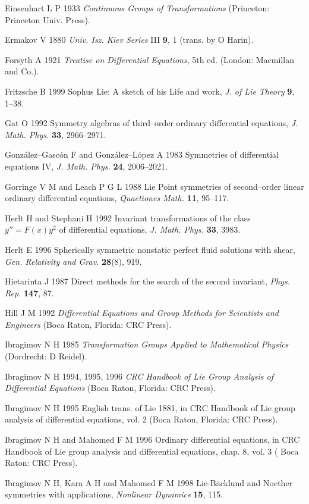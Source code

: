 Einsenhart L P 1933 {\em Continuous Groups of
Transformations} (Princeton: Princeton Univ. Press).

Ermakov V 1880 {\em Univ. Isz. Kiev Series} III {\bf 9}, 1
(trans. by O Harin).

Forsyth A 1921 {\em Treatise on Differential Equations}, 5th ed.
(London: Macmillan and Co.).

Fritzsche B 1999 Sophus Lie: A sketch of his Life and work,
{\em  J. of Lie Theory} {\bf 9}, 1--38.  

Gat O 1992  Symmetry algebras of third--order ordinary
differential equations, {\em J. Math. Phys.} {\bf 33}, 2966--2971.

Gonz\'alez--Gasc\'on F and Gonz\'alez--L\'opez  A 1983
Symmetries of differential equations IV, {\em J. Math. Phys.} {\bf 24},
2006--2021.

Gorringe V M and Leach P G L 1988
Lie Point symmetries of second--order linear ordinary differential
equations, {\em Quaetiones Math.} {\bf 11}, 95--117.

Herlt H and  Stephani H 1992  Invariant transformations of the class
$y''=F(x)y^2$ of differential equations, {\em J. Math. Phys.} {\bf 33}, 3983. 

Herlt E 1996 Spherically symmetric nonstatic perfect fluid solutions with
shear, {\em Gen. Relativity and Grav.} {\bf28}(8), 919.

Hietarinta J 1987 Direct methods for the search of the second invariant,
{\em Phys. Rep.} {\bf 147}, 87.

Hill J M  1992 {\em Differential Equations and Group Methods for Scientists
and Engineers} (Boca Raton, Florida: CRC Press).

Ibragimov N H 1985 {\em Transformation Groups Applied to Mathematical
Physics} (Dordrecht: D Reidel).

Ibragimov N H  1994, 1995, 1996 {\em CRC Handbook of Lie Group
Analysis of Differential Equations} (Boca Raton, Florida: CRC Press).

Ibragimov N H 1995  English trans. of Lie 1881, in
CRC Handbook of Lie group analysis of differential equations, vol. 2
(Boca Raton, Florida: CRC Press).

Ibragimov N H and Mahomed F M 1996  Ordinary differential equations,
in  CRC Handbook of Lie group analysis and differential equations,
chap. 8, vol. 3 ( Boca Raton: CRC Press).

Ibragimov N H, Kara A H and Mahomed F M 1998 Lie-B\"acklund and
Noether symmetries with applications, {\em Nonlinear Dynamics} {\bf 15}, 115.

